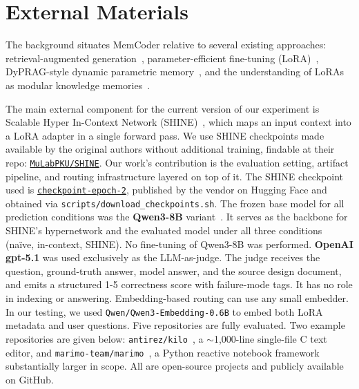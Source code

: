 \documentclass[conference,10.5pt]{IEEEtran}
\begin{document}
\section{External Materials}

The background situates MemCoder relative to several existing approaches:
retrieval-augmented generation~\cite{lewis2021retrievalaugmentedgenerationknowledgeintensivenlp},
parameter-efficient fine-tuning (LoRA)~\cite{hu2021loralowrankadaptationlarge},
DyPRAG-style dynamic parametric memory~\cite{tan2025dynamicparametricretrievalaugmented}, and the
understanding of LoRAs as modular knowledge memories~\cite{back2026understandingloraknowledgememory}.

The main external component for the current version of our experiment 
is Scalable Hyper In-Context Network (SHINE)~\cite{liuSHINEScalableInContext2026},
which maps an input context into a LoRA adapter in a single forward pass.
We use SHINE checkpoints made available by the original authors without 
additional training, findable at their repo: \href{https://github.com/MuLabPKU/SHINE}{\texttt{MuLabPKU/SHINE}}.
Our work's contribution is the evaluation setting, artifact pipeline, and 
routing infrastructure layered on top of it.
The SHINE checkpoint used is \href{https://huggingface.co/papers/2602.06358}{\texttt{checkpoint-epoch-2}}, published by the vendor on Hugging Face and obtained via \texttt{scripts/download\_checkpoints.sh}.
The frozen base model for all prediction conditions was the 
\textbf{Qwen3-8B} variant~\cite{yangQwen3TechnicalReport2025}. 
It serves as the backbone for SHINE's 
hypernetwork and the evaluated model under all three conditions 
(naïve, in-context, SHINE). No fine-tuning of Qwen3-8B was performed.
\textbf{OpenAI gpt-5.1} was used exclusively as the LLM-as-judge.  The
judge receives the question, ground-truth answer, model answer, and the source design document, and emits a structured
1-5 correctness score with failure-mode tags.  It has no role in
indexing or answering.
Embedding-based routing can use any small embedder. In our testing, 
we used \texttt{Qwen/Qwen3-Embedding-0.6B} to embed both LoRA metadata 
and user questions.
Five repositories are fully evaluated. Two example repositories are given below:
\texttt{antirez/kilo}~\cite{sanfilippoAntirezKilo2026}, a $\sim$1,000-line single-file C text
editor, and \texttt{marimo-team/marimo}~\cite{agrawalMarimoOpensourceReactive2023}, a Python reactive
notebook framework substantially larger in scope.  All are open-source
projects and publicly available on GitHub.
\end{document}
